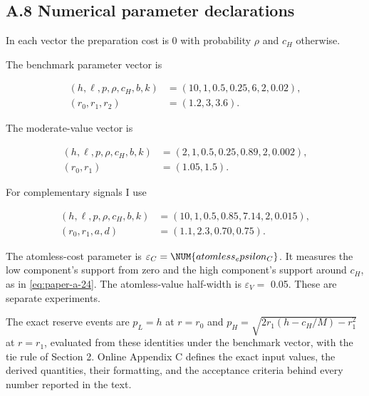 \subsection{A.8 Numerical parameter declarations}\label{pa-parameters}

In each vector the preparation cost is \(0\) with probability \(\rho\) and
\(c_H\) otherwise.

The benchmark parameter vector is

\[
\begin{aligned}
(h,\ell,p,\rho,c_H,b,k)
&=(10,1,0.5,0.25,6,2,0.02),\\
(r_0,r_1,r_2)&=(1.2,3,3.6).
\end{aligned}
\tag{A.55}\label{eq:paper-a-55}
\]

The moderate-value vector is

\[
\begin{aligned}
(h,\ell,p,\rho,c_H,b,k)
&=(2,1,0.5,0.25,0.89,2,0.002),\\
(r_0,r_1)&=(1.05,1.5).
\end{aligned}
\tag{A.56}\label{eq:paper-a-56}
\]

For complementary signals I use

\[
\begin{aligned}
(h,\ell,p,\rho,c_H,b,k)
&=(10,1,0.5,0.85,7.14,2,0.015),\\
(r_0,r_1,a,d)
&=(1.1,2.3,0.70,0.75).
\end{aligned}
\tag{A.57}\label{eq:paper-a-57}
\]

The atomless-cost parameter is \(\varepsilon_C=\NUM{atomless_epsilon_C}\).
It measures the low component's support from zero and the high component's
support around \(c_H\), as in \eqref{eq:paper-a-24}.
The atomless-value half-width is \(\varepsilon_V=\) 0.05. These are separate
experiments.

The exact reserve events are
\(p_L=h\) at \(r=r_0\) and \(p_H=\sqrt{2r_1(h-c_H/M)-r_1^2}\) at
\(r=r_1\), evaluated from these identities under the benchmark vector,
with the tie rule of Section 2. Online Appendix C defines the exact
input values, the derived quantities, their formatting, and the
acceptance criteria behind every number reported in the text.
